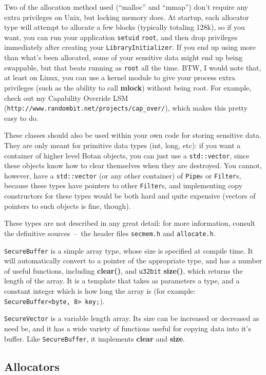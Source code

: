 \documentclass{article}
\newcommand{\filename}[1]{\texttt{#1}}
\newcommand{\function}[1]{\textbf{#1}}
\newcommand{\type}[1]{\texttt{#1}}
\newcommand{\url}[1]{\texttt{#1}}
\begin{document}
Two of the allocation method used (``malloc'' and ``mmap'') don't
require any extra privileges on Unix, but locking memory does. At
startup, each allocator type will attempt to allocate a few blocks
(typically totaling 128k), so if you want, you can run your
application \texttt{setuid} \texttt{root}, and then drop privileges
immediately after creating your \type{LibraryInitializer}. If you end
up using more than what's been allocated, some of your sensitive data
might end up being swappable, but that beats running as \texttt{root}
all the time. BTW, I would note that, at least on Linux, you can use a
kernel module to give your process extra privileges (such as the
ability to call \function{mlock}) without being root. For example,
check out my Capability Override LSM
(\url{http://www.randombit.net/projects/cap\_over/}), which makes this
pretty easy to do.

These classes should also be used within your own code for storing sensitive
data. They are only meant for primitive data types (int, long, etc): if you
want a container of higher level Botan objects, you can just use a
\verb|std::vector|, since these objects know how to clear themselves when they
are destroyed. You cannot, however, have a \verb|std::vector| (or any other
container) of \type{Pipe}s or \type{Filter}s, because these types have pointers
to other \type{Filter}s, and implementing copy constructors for these types
would be both hard and quite expensive (vectors of pointers to such objects is
fine, though).

These types are not described in any great detail: for more information,
consult the definitive sources~--~the header files \filename{secmem.h} and
\filename{allocate.h}.

\type{SecureBuffer} is a simple array type, whose size is specified at compile
time. It will automatically convert to a pointer of the appropriate type, and
has a number of useful functions, including \function{clear()}, and
\type{u32bit} \function{size()}, which returns the length of the array. It is a
template that takes as parameters a type, and a constant integer which is how
long the array is (for example: \verb|SecureBuffer<byte, 8> key;|).

\type{SecureVector} is a variable length array. Its size can be increased or
decreased as need be, and it has a wide variety of functions useful for copying
data into it's buffer. Like \type{SecureBuffer}, it implements \function{clear}
and \function{size}.

\subsection{Allocators}
\end{document}
